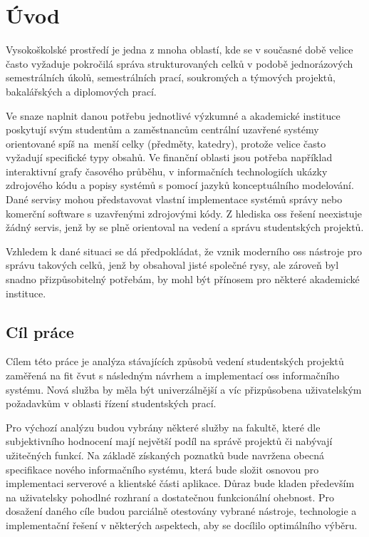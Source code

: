\chapter{Úvod}

Vysokoškolské prostředí je jedna z mnoha oblastí, kde se v současné době velice často vyžaduje pokročilá správa strukturovaných celků v podobě jednorázových semestrálních úkolů, semestrálních prací, soukromých a týmových projektů, bakalářských a diplomových prací.

Ve snaze naplnit danou potřebu jednotlivé výzkumné a akademické instituce poskytují svým studentům a zaměstnancům centrální uzavřené systémy orientované spíš na~menší celky (předměty, katedry), protože velice často vyžadují specifické typy obsahů. Ve finanční oblasti jsou potřeba například interaktivní grafy časového průběhu, v informačních technologiích ukázky zdrojového kódu a popisy systémů s pomocí jazyků konceptuálního modelování. Dané servisy mohou představovat vlastní implementace systémů správy nebo komerční software s uzavřenými zdrojovými kódy. Z hlediska \gls{oss} řešení neexistuje žádný servis, jenž by se plně orientoval na vedení a správu studentských projektů.

Vzhledem k dané situaci se dá předpokládat, že vznik moderního \gls{oss} nástroje pro správu takových celků, jenž by obsahoval jisté společné rysy, ale zároveň byl snadno přizpůsobitelný potřebám, by mohl být přínosem pro některé akademické instituce.



\clearpage
\section{Cíl práce}

Cílem této práce je analýza stávajících způsobů vedení studentských projektů zaměřená na \gls{fit} \gls{čvut} s následným návrhem a implementací \gls{oss} informačního systému. Nová služba by měla být univerzálnější a víc přizpůsobena uživatelským požadavkům v oblasti řízení studentských prací.

Pro výchozí analýzu budou vybrány některé služby na fakultě, které dle subjektivního hodnocení mají největší podíl na správě projektů či nabývají užitečných funkcí. Na základě získaných poznatků bude navržena obecná specifikace nového informačního systému, která bude složit osnovou pro implementaci serverové a klientské části aplikace. Důraz bude kladen především na uživatelsky pohodlné rozhraní a dostatečnou funkcionální ohebnost. Pro dosažení daného cíle budou parciálně otestovány vybrané nástroje, technologie a implementační řešení v některých aspektech, aby se docílilo optimálního výběru.

